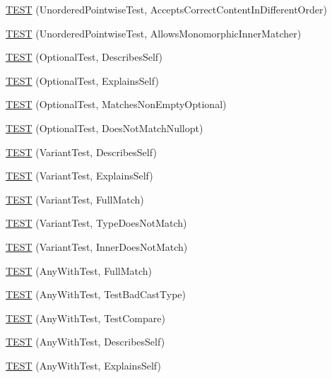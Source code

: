\begin{DoxyCompactItemize}
\item 
\mbox{\hyperlink{namespacetesting_1_1gmock__matchers__test_a3d48732b4a6069cfcf5c0dde6027dad5}{T\+E\+ST}} (Unordered\+Pointwise\+Test, Accepts\+Correct\+Content\+In\+Different\+Order)
\item 
\mbox{\hyperlink{namespacetesting_1_1gmock__matchers__test_af16d28a9f3a07b8ef2962b868b4f8399}{T\+E\+ST}} (Unordered\+Pointwise\+Test, Allows\+Monomorphic\+Inner\+Matcher)
\item 
\mbox{\hyperlink{namespacetesting_1_1gmock__matchers__test_af95ffc596bae2c2d552080210cc2d75e}{T\+E\+ST}} (Optional\+Test, Describes\+Self)
\item 
\mbox{\hyperlink{namespacetesting_1_1gmock__matchers__test_a4a09099193a53ab3e83fad7062bfdff0}{T\+E\+ST}} (Optional\+Test, Explains\+Self)
\item 
\mbox{\hyperlink{namespacetesting_1_1gmock__matchers__test_aa763f9478bee483d8b218803117693c1}{T\+E\+ST}} (Optional\+Test, Matches\+Non\+Empty\+Optional)
\item 
\mbox{\hyperlink{namespacetesting_1_1gmock__matchers__test_aa3ff7bcbfff3bd7c1b0db8c910637482}{T\+E\+ST}} (Optional\+Test, Does\+Not\+Match\+Nullopt)
\item 
\mbox{\hyperlink{namespacetesting_1_1gmock__matchers__test_a97d781c5c0c52c5e189b2211714957b7}{T\+E\+ST}} (Variant\+Test, Describes\+Self)
\item 
\mbox{\hyperlink{namespacetesting_1_1gmock__matchers__test_a61087a1b752685744cc31e2e459aa9e7}{T\+E\+ST}} (Variant\+Test, Explains\+Self)
\item 
\mbox{\hyperlink{namespacetesting_1_1gmock__matchers__test_afacaf5f72c4160e1b01c8db4dd116d81}{T\+E\+ST}} (Variant\+Test, Full\+Match)
\item 
\mbox{\hyperlink{namespacetesting_1_1gmock__matchers__test_a8658fa7df92e4f5476d583fd691b1b88}{T\+E\+ST}} (Variant\+Test, Type\+Does\+Not\+Match)
\item 
\mbox{\hyperlink{namespacetesting_1_1gmock__matchers__test_a505e6c087c180d84af53caac65a19e85}{T\+E\+ST}} (Variant\+Test, Inner\+Does\+Not\+Match)
\item 
\mbox{\hyperlink{namespacetesting_1_1gmock__matchers__test_a1e590af03119a576f0a1967ad0913e73}{T\+E\+ST}} (Any\+With\+Test, Full\+Match)
\item 
\mbox{\hyperlink{namespacetesting_1_1gmock__matchers__test_a3cd540ce4eeb41c7f54469072bcfabac}{T\+E\+ST}} (Any\+With\+Test, Test\+Bad\+Cast\+Type)
\item 
\mbox{\hyperlink{namespacetesting_1_1gmock__matchers__test_a028fccc8764077f9b8e2f37b012aaa70}{T\+E\+ST}} (Any\+With\+Test, Test\+Compare)
\item 
\mbox{\hyperlink{namespacetesting_1_1gmock__matchers__test_a47e76f27901817ad3fb526172e6ecc00}{T\+E\+ST}} (Any\+With\+Test, Describes\+Self)
\item 
\mbox{\hyperlink{namespacetesting_1_1gmock__matchers__test_a5e9f41e9a39a6de9c69d06250d62a67a}{T\+E\+ST}} (Any\+With\+Test, Explains\+Self)
\end{DoxyCompactItemize}

